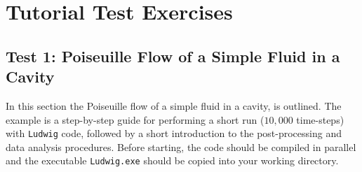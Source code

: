 \documentclass[11pt,twoside,a4paper]{article}
\begin{document}
\section{Tutorial Test Exercises}

\subsection{Test 1: Poiseuille Flow of a Simple Fluid in a Cavity}

In this section the Poiseuille flow of a simple fluid in a cavity, is outlined. 
The example is a step-by-step guide for performing a short run ($10,000$ time-steps) 
with \texttt{Ludwig} code, followed by a short introduction to the post-processing 
and data analysis procedures. Before starting, the code should be compiled in 
parallel and the executable \texttt{Ludwig.exe} should be copied into your working directory.
\end{document}
